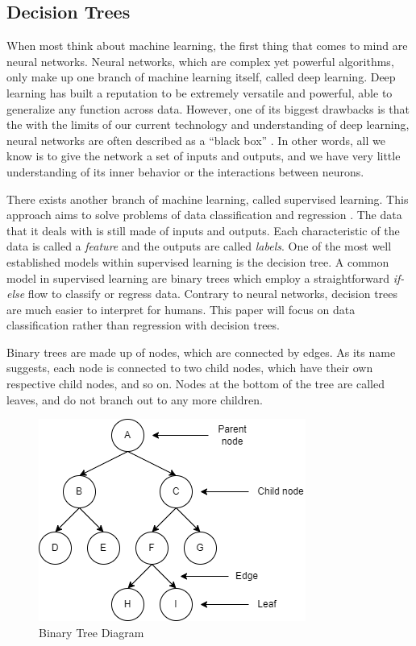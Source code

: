 \documentclass[12pt]{article}
\begin{document}
\subsection{Decision Trees}

When most think about machine learning, the first thing that comes to mind are neural networks. Neural networks, which are complex yet powerful algorithms, only make up one branch of machine learning itself, called deep learning. Deep learning has built a reputation to be extremely versatile and powerful, able to generalize any function across data. However, one of its biggest drawbacks is that the with the limits of our current technology and understanding of deep learning, neural networks are often described as a ``black box'' \cite{Buhrmester_Munch_Arens_2019}. In other words, all we know is to give the network a set of inputs and outputs, and we have very little understanding of its inner behavior or the interactions between neurons.

There exists another branch of machine learning, called supervised learning. This approach aims to solve problems of data classification and regression \cite{Supervised_unsupervised_learning}. The data that it deals with is still made of inputs and outputs. Each characteristic of the data is called a \textit{feature} and the outputs are called \textit{labels}. One of the most well established models within supervised learning is the decision tree. A common model in supervised learning are binary trees which employ a straightforward \textit{if-else} flow to classify or regress data. Contrary to neural networks, decision trees are much easier to interpret for humans. This paper will focus on data classification rather than regression with decision trees.

Binary trees are made up of nodes, which are connected by edges. As its name suggests, each node is connected to two child nodes, which have their own respective child nodes, and so on. Nodes at the bottom of the tree are called leaves, and do not branch out to any more children.

\begin{figure}[H]
    \centering
    \includegraphics[scale=0.6]{figs/binary_tree.png}
    \caption{Binary Tree Diagram}
    \label{fig:binarytree}
\end{figure}
\end{document}
